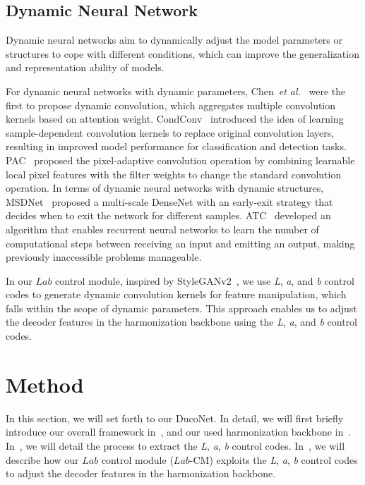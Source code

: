 \documentclass[sigconf]{acmart}
\begin{document}
\subsection{Dynamic Neural Network}
Dynamic neural networks aim to dynamically adjust the model parameters or structures to cope with different conditions, which can improve the generalization and representation ability of models.

For dynamic neural networks with dynamic parameters, Chen~\emph{et al.}~\cite{dynamic_conv} were the first to propose dynamic convolution, which aggregates multiple convolution kernels based on attention weight. 
CondConv~\cite{condconv} introduced the idea of learning sample-dependent convolution kernels to replace original convolution layers, resulting in improved model performance for classification and detection tasks. 
PAC~\cite{PAC} proposed the pixel-adaptive convolution operation by combining learnable local pixel features with the filter weights to change the standard convolution operation. 
In terms of dynamic neural networks with dynamic structures, MSDNet~\cite{huang2017multi} proposed a multi-scale DenseNet with an early-exit strategy that decides when to exit the network for different samples. 
ATC~\cite{graves2016adaptive} developed an algorithm that enables recurrent neural networks to learn the number of computational steps between receiving an input and emitting an output, making previously inaccessible problems manageable.

In our $Lab$ control module, inspired by StyleGANv2~\cite{styleganv2}, we use \textit{L}, \textit{a}, and \textit{b} control codes to generate dynamic convolution kernels for feature manipulation, which falls within the scope of dynamic parameters. 
This approach enables us to adjust the decoder features in the harmonization backbone using the \textit{L}, \textit{a}, and \textit{b} control codes.

\section{Method} \label{section:Method}

In this section, we will set forth to our DucoNet. 
In detail, we will first briefly introduce our overall framework in~, and our used harmonization backbone in~.
In~, we will detail the process to extract the \textit{L}, \textit{a}, \textit{b} control codes.
In~, we will describe how our $Lab$ control module ($Lab$-CM) exploits the \textit{L}, \textit{a}, \textit{b} control codes to adjust the decoder features in the harmonization backbone.
\end{document}
